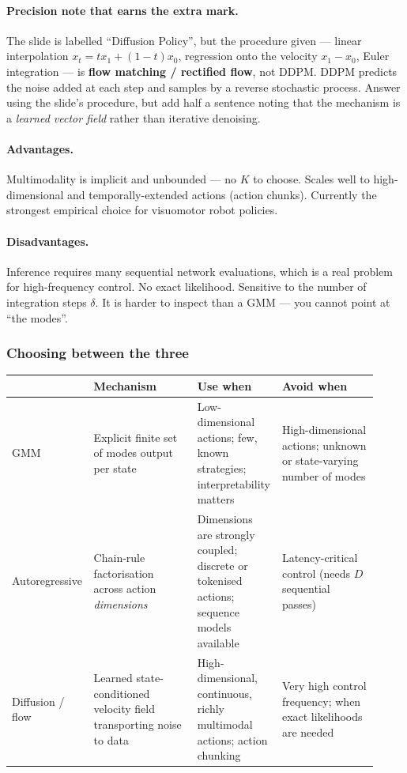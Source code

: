 \documentclass[11pt,a4paper]{article}
\begin{document}
\paragraph{Precision note that earns the extra mark.} The slide is labelled
``Diffusion Policy'', but the procedure given --- linear interpolation
$x_t=tx_1+(1-t)x_0$, regression onto the velocity $x_1-x_0$, Euler
integration --- is \textbf{flow matching / rectified flow}, not DDPM. DDPM
predicts the noise added at each step and samples by a reverse stochastic
process. Answer using the slide's procedure, but add half a sentence noting
that the mechanism is a \emph{learned vector field} rather than iterative
denoising.

\paragraph{Advantages.} Multimodality is implicit and unbounded --- no $K$ to
choose. Scales well to high-dimensional and temporally-extended actions
(action chunks). Currently the strongest empirical choice for visuomotor
robot policies.

\paragraph{Disadvantages.} Inference requires many sequential network
evaluations, which is a real problem for high-frequency control. No exact
likelihood. Sensitive to the number of integration steps $\delta$. It is
harder to inspect than a GMM --- you cannot point at ``the modes''.

\subsubsection{Choosing between the three}

\begin{center}
\small\begin{tabular}{@{}>{\raggedright\arraybackslash}p{0.16\linewidth}>{\raggedright\arraybackslash}p{0.29\linewidth}>{\raggedright\arraybackslash}p{0.21\linewidth}>{\raggedright\arraybackslash}p{0.26\linewidth}@{}}
\toprule
& \textbf{Mechanism} & \textbf{Use when} & \textbf{Avoid when} \\
\midrule
GMM & Explicit finite set of modes output per state & Low-dimensional actions; few, known strategies; interpretability matters & High-dimensional actions; unknown or state-varying number of modes \\
\addlinespace
Autoregressive & Chain-rule factorisation across action \emph{dimensions} & Dimensions are strongly coupled; discrete or tokenised actions; sequence models available & Latency-critical control (needs $D$ sequential passes) \\
\addlinespace
Diffusion / flow & Learned state-conditioned velocity field transporting noise to data & High-dimensional, continuous, richly multimodal actions; action chunking & Very high control frequency; when exact likelihoods are needed \\
\bottomrule
\end{tabular}
\end{center}
\end{document}

